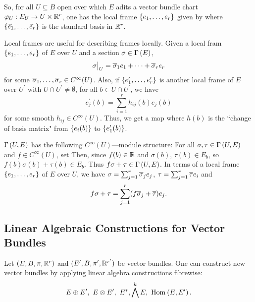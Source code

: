 \documentclass[main.tex]{subfiles}
\begin{document}
So, for all $U \subseteq B$ open over which $E$ adits a vector bundle chart $\varphi_U : E_U  \to U \times \mathbb{R}^r$, one has the local frame $\left\{e_1,\dots, e_r\right\}$ given by
where $\left\{\vec{e}_1, \dots, \vec{e}_r\right\}$ is the standard basis in $\mathbb{R}^r$.

Local frames are useful for describing frames locally. Given a local fram $\left\{e_1, \dots, e_r\right\}$ of $E$ over $U$ and a section $\sigma \in \Gamma\left( E \right)$,
\[
\sigma\big|_{U} = \overline{\sigma}_1 e_1 + \dots + \overline{\sigma}_r e_r
\]
for some $\overline{\sigma}_1, \dots, \overline{\sigma}_r \in C^\infty(U)$.
Also, if $\left\{e_1^\prime, \dots, e_r^\prime\right\}$ is another local frame of $E$ over $U^\prime$ with $U \cap U^\prime \neq \emptyset$, for all $b \in U \cap U^\prime$, we have
\[
    e_j^\prime(b) = \sum_{i=1}^r h_{ij}(b)e_j(b)
\] for some smooth $h_{ij} \in C^\infty(U)$. Thus, we get a map
 where $h(b)$ is the ``change of basis matrix" from $\left\{e_i(b)\right\}$ to $\left\{e_1^\prime(b)\right\}$.

\begin{note}
$\Gamma\left( U, E \right)$ has the following $C^\infty(U)$---module structure: For all $\sigma, \tau \in \Gamma\left( U, E \right)$ and $f \in C^\infty(U)$, set 
Then, since $f(b) \in \mathbb{R}$ and $\sigma(b)$, $\tau(b) \in E_b$, so $f(b)\sigma(b) + \tau(b) \in E_b$. Thus $f\sigma + \tau \in \Gamma\left( U, E \right)$. In terms of a local frame $\left\{e_1, \dots, e_r\right\}$ of $E$ over $U$, we have $\sigma = \sum_{j=1}^r \overline{\sigma}_je_j$, $\tau = \sum_{j=1}^r \overline{\tau} e_i$ and 
\[
f \sigma + \tau = \sum_{j=1}^r (f\overline{\sigma}_j + \overline{\tau})e_j.
\]
\end{note}

\subsection{Linear Algebraic Constructions for Vector Bundles}

Let $(E, B , \pi, \mathbb{R}^r)$ and $(E^\prime, B, \pi^\prime, \mathbb{R}^{r^\prime})$ be vector bundles. One can construct new vector bundles by applying linear algebra constructions fibrewise:
\[
E \oplus E^\prime, \ E \otimes E^\prime, \ E^*, \bigwedge^k E, \ \text{Hom}_{}\left( E, E^\prime \right).
\]
\end{document}
